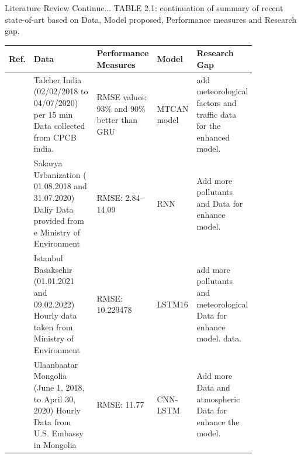 \documentclass[12pt, aspectratio=169]{beamer}
\begin{document}
\begin{frame}{Literature Review  \tiny{Continue...}}
	\centering
	\scriptsize {TABLE 2.1: continuation of summary of recent state-of-art based on Data,  Model proposed,  Performance measures and Research gap.}\\
	\begin{table}
		\centering
		\begin{tabular}{|p{0.03\linewidth}|p{0.29\linewidth}|p{0.15\linewidth}|p{0.16\linewidth}|p{0.21\linewidth}|}
			\hline
			\footnotesize \textbf {Ref.} & \footnotesize \textbf { Data} & \footnotesize \textbf {Performance Measures } & \footnotesize \textbf {Model} & \footnotesize \textbf {Research Gap }  \\ \hline
			\scriptsize \cite{samal2021multi}  \scriptsize & Talcher India (02/02/2018 to   04/07/2020) per 15 min Data collected from CPCB india.                    \scriptsize & RMSE values:  93\%  and 90\% better than GRU                                                              \scriptsize & MTCAN model                                                         \scriptsize & add meteorological factors and traffic data for the enhanced model.                                                               \\\hline
			\scriptsize \cite{kurnaz2022prediction}          \scriptsize & Sakarya Urbanization (   01.08.2018 and 31.07.2020) Daliy Data provided from e Ministry of Environment   \scriptsize & RMSE:  2.84–14.09                                                                                       \scriptsize & RNN                                                                 \scriptsize & Add more pollutants and Data for enhance model.    \\\hline
			\scriptsize \cite{das2022prediction}           \scriptsize & Istanbul Basaksehir (01.01.2021   and 09.02.2022) Hourly data taken from Ministry of Environment         \scriptsize & RMSE: 10.229478                                                                                          \scriptsize & LSTM16                                                              \scriptsize & add more pollutants and  meteorological Data for enhance model. data.                                          \\\hline
			\scriptsize \cite{natsagdorj2023prediction}              \scriptsize & Ulaanbaatar Mongolia  (June 1,  2018, to  April 30,  2020) Hourly Data from U.S.   Embassy in Mongolia      \scriptsize & RMSE: 11.77                                                                                              \scriptsize & CNN-LSTM                                                            \scriptsize & Add more Data and atmospheric Data for enhance the model.  \\\hline
		 \end{tabular}
	\end{table}
\end{frame}
\end{document}

